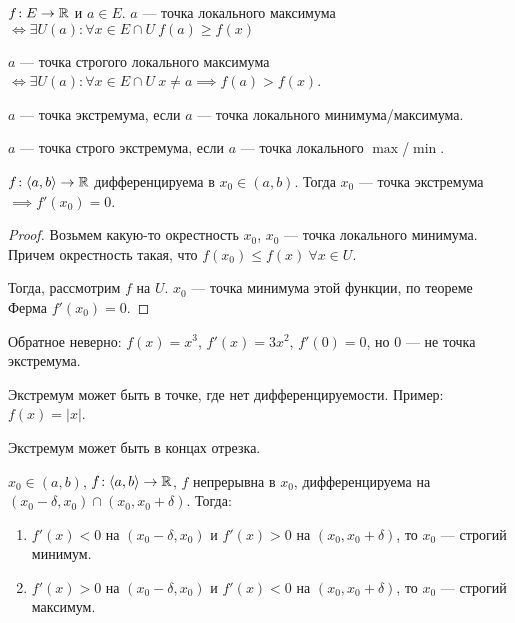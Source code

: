 \begin{definition}
    $f\!: E \to \mathbb{R}$ и  $a \in E$. $a$ --- точка локального максимума $\iff \exists U(a)\!: \forall x \in E \cap U\ f(a)\ge f(x)$ 
\end{definition}
\begin{definition}
    $a$ --- точка строгого локального максимума  $\iff \exists U(a)\!: \forall x \in E \cap U\ x \neq a \implies f(a) > f(x)$.
\end{definition}
\begin{definition}
    $a$ --- точка экстремума, если  $a$ --- точка локального минимума/максимума.
\end{definition}
\begin{definition}
    $a$ --- точка строго экстремума, если  $a$ --- точка локального  $\max$/$\min$.
\end{definition}
\begin{theorem}
    $f\!:\langle a, b \rangle \to \mathbb{R}$ дифференцируема в  $x_0 \in (a, b)$. Тогда  $x_0$ --- точка экстремума  $\implies f'(x_0) = 0$.
\end{theorem}
\begin{proof}
    Возьмем какую-то окрестность $x_0$, $x_0$ --- точка локального минимума. Причем окрестность такая, что $f(x_0) \le f(x)\ \forall x \in U$. 

    Тогда, рассмотрим $f$ на  $U$.  $x_0$ --- точка минимума этой функции, по теореме Ферма  $f'(x_0) = 0$.
\end{proof}
\begin{remark}
    Обратное неверно: $f(x) = x^3$,  $f'(x) = 3x^2$,  $f'(0) = 0$, но  $0$ --- не точка экстремума.
\end{remark}
\begin{remark}
    Экстремум может быть в точке, где нет дифференцируемости. Пример: $f(x) = |x|$.
\end{remark}
\begin{remark}
    Экстремум может быть в концах отрезка. 
\end{remark}
\begin{theorem}
    $x_0 \in (a, b)$,  $f\!:\langle a, b \rangle \to \mathbb{R}$,  $f$ непрерывна в  $x_0$, дифференцируема на  $(x_0 - \delta, x_0) \cap (x_0, x_0 + \delta)$. Тогда: 
    \begin{enumerate}
        \item $f'(x) < 0$ на  $(x_0-\delta, x_0)$ и $f'(x) > 0$ на  $(x_0, x_0+\delta)$, то $x_0$ --- строгий минимум.
        \item $f'(x) > 0$ на  $(x_0-\delta, x_0)$ и $f'(x) < 0$ на  $(x_0, x_0+\delta)$, то $x_0$ --- строгий максимум.
    \end{enumerate}
\end{theorem}
